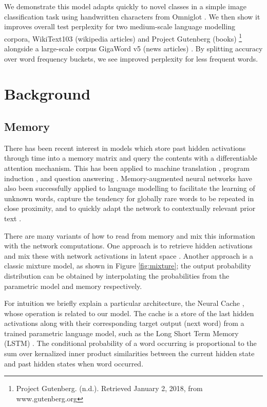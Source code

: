 \documentclass{article} \usepackage{hyperref}
\begin{document}
We demonstrate this model adapts quickly to novel classes in a simple image classification task using handwritten characters from Omniglot \cite{lake2015human}. We then show it improves overall test perplexity for two medium-scale language modelling corpora, WikiText103 (wikipedia articles) \citep{merity2016pointer} and Project Gutenberg  (books) \footnote{Project Gutenberg. (n.d.). Retrieved January 2, 2018, from www.gutenberg.org} alongside a large-scale corpus GigaWord v5 (news articles) \citep{parker2011english}. By splitting accuracy over word frequency buckets, we see improved perplexity for less frequent words. 


\section{Background}




\subsection{Memory}


There has been recent interest in models which store past hidden activations through time  into a memory matrix and query the contents with a differentiable attention mechanism. This has been applied to  machine translation \citep{bahdanau2014neural}, program induction \citep{graves2014neural, graves2016hybrid}, and question answering \citep{sukhbaatar2015end}. Memory-augmented neural networks have also been successfully applied to language modelling \citep{vinyals2015pointer, kawakami2017learning, merity2016pointer, grave2016improving, grave2017unbounded} to facilitate the learning of unknown words, capture the tendency for globally rare words to be repeated in close proximity, and to quickly adapt the network to contextually relevant prior text \citep{sprechmann2018memorybased}.

There are many variants of how to read from memory and mix this information with the network computations. One approach is to retrieve hidden activations and mix these with network activations in latent space \citep{gulcehre2016pointing}. Another approach is a classic mixture model, as shown in Figure \ref{fig:mixture}; the output probability distribution can be obtained by interpolating the probabilities  from the parametric model and memory respectively.

For intuition we briefly explain a particular architecture, the Neural Cache \citep{grave2016improving}, whose operation is related to our model. The cache is a store of the last  hidden activations along with their corresponding target output (next word) from a trained parametric language model, such as the Long Short Term Memory (LSTM) \citep{hochreiter1997long}. The conditional probability of a word  occurring is proportional to the sum over kernalized inner product similarities between the current hidden state  and past hidden states when word  occurred.
\end{document}
